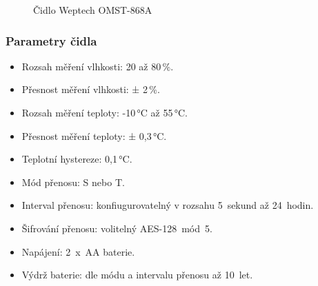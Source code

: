 \begin{figure}[!ht]
\vspace{-5pt}
    \centering
			\hspace*{5mm}
		\caption{Čidlo Weptech OMST-868A~\cite{CidloWeptech}}
		\vspace{-25pt}
\end{figure}

\subsubsection{Parametry čidla}
\begin{itemize}
	\item Rozsah měření vlhkosti: 20 až 80\,\%.
	\item Přesnost měření vlhkosti: ± 2\,\%.
	\item Rozsah měření teploty: -10\,°C až 55\,°C.
	\item Přesnost měření teploty: ± 0,3\,°C.
	\item Teplotní hystereze: 0,1\,°C.
	\item Mód přenosu: S nebo T.
	\item Interval přenosu: konfiugurovatelný v rozsahu 5~sekund až 24~hodin.
	\item Šifrování přenosu: volitelný AES-128~mód~5.
	\item Napájení: 2~x~AA baterie.
	\item Výdrž baterie: dle módu a intervalu přenosu až 10~let.
\end{itemize}


